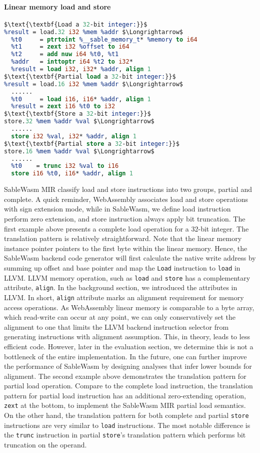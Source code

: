 \paragraph{Linear memory load and store} \quad
\begin{lstlisting}[basicstyle=\linespread{0.9}\small\ttfamily, language=LLVM, mathescape=true]
$\text{\textbf{Load a 32-bit integer:}}$
%result = load.32 i32 %mem %addr $\Longrightarrow$
  %t0     = ptrtoint %__sable_memory_t* %memory to i64
  %t1     = zext i32 %offset to i64
  %t2     = add nuw i64 %t0, %t1
  %addr   = inttoptr i64 %t2 to i32*
  %result = load i32, i32* %addr, align 1
$\text{\textbf{Partial load a 32-bit integer:}}$
%result = load.16 i32 %mem %addr $\Longrightarrow$
  ......
  %t0     = load i16, i16* %addr, align 1
  %result = zext i16 %t0 to i32
$\text{\textbf{Store a 32-bit integer:}}$
store.32 %mem %addr %val $\Longrightarrow$
  ......
  store i32 %val, i32* %addr, align 1
$\text{\textbf{Partial store a 32-bit integer:}}$
store.16 %mem %addr %val $\Longrightarrow$
  ...... 
  %t0    = trunc i32 %val to i16
  store i16 %t0, i16* %addr, align 1
\end{lstlisting}
SableWasm MIR classify load and store instructions into two groups, partial and complete. A quick reminder, WebAssembly associates load and store operations with sign extension mode, while in SableWasm, we define load instruction perform zero extension, and store instruction always apply bit truncation. The first example above presents a complete load operation for a 32-bit integer. The translation pattern is relatively straightforward. Note that the linear memory instance pointer pointers to the first byte within the linear memory. Hence, the SableWasm backend code generator will first calculate the native write address by summing up offset and base pointer and map the \texttt{Load} instruction to \texttt{load} in LLVM. LLVM memory operation, such as \texttt{load} and \texttt{store} has a complementary attribute, \texttt{align}. In the background section, we introduced the attributes in LLVM. In short, \texttt{align} attribute marks an alignment requirement for memory access operations. As WebAssembly linear memory is comparable to a byte array, which read-write can occur at any point, we can only conservatively set the alignment to one that limits the LLVM backend instruction selector from generating instructions with alignment assumption. This, in theory, leads to less efficient code. However, later in the evaluation section, we determine this is not a bottleneck of the entire implementation. In the future, one can further improve the performance of SableWasm by designing analyses that infer lower bounds for alignment. The second example above demonstrates the translation pattern for partial load operation. Compare to the complete load instruction, the translation pattern for partial load instruction has an additional zero-extending operation, \texttt{zext} at the bottom, to implement the SableWasm MIR partial load semantics. On the other hand, the translation pattern for both complete and partial \texttt{store} instructions are very similar to \texttt{load} instructions. The most notable difference is the \texttt{trunc} instruction in partial \texttt{store}'s translation pattern which performs bit truncation on the operand.

